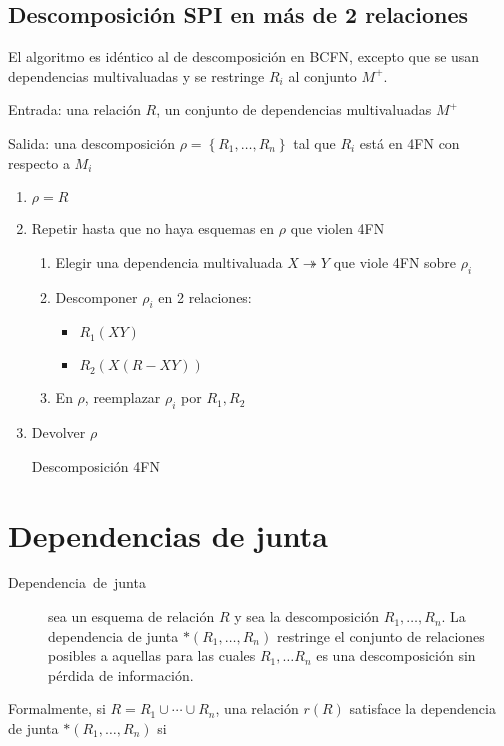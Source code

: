 \documentclass[a4paper, twoside]{article}
\begin{document}
\subsection{Descomposición SPI en más de 2 relaciones}

El algoritmo es idéntico al de descomposición en BCFN, excepto que
se usan dependencias multivaluadas y se restringe $R_{i}$ al conjunto
$M^{+}$.

\begin{algorithm}[H]
Entrada: una relación $R$, un conjunto de dependencias multivaluadas
$M^{+}$

Salida: una descomposición $\rho=\left\{ R_{1},\ldots,R_{n}\right\} $
tal que $R_{i}$ está en 4FN con respecto a $M_{i}$
\begin{enumerate}
\item $\rho=R$
\item Repetir hasta que no haya esquemas en $\rho$ que violen 4FN

\begin{enumerate}
\item Elegir una dependencia multivaluada $X\twoheadrightarrow Y$ que viole
4FN sobre $\rho_{i}$
\item Descomponer $\rho_{i}$ en 2 relaciones:

\begin{itemize}
\item $R_{1}\left(XY\right)$
\item $R_{2}\left(X(R-XY)\right)$
\end{itemize}
\item En $\rho$, reemplazar $\rho_{i}$ por $R_{1},R_{2}$
\end{enumerate}
\item Devolver $\rho$\protect\caption{Descomposición 4FN}
\end{enumerate}
\end{algorithm}



\section{Dependencias de junta}
\begin{description}
\item [{Dependencia~de~junta}] sea un esquema de relación $R$ y sea
la descomposición $R_{1},\ldots,R_{n}$. La dependencia de junta $*\left(R_{1},\ldots,R_{n}\right)$
restringe el conjunto de relaciones posibles a aquellas para las cuales
$R_{1},\ldots R_{n}$ es una descomposición sin pérdida de información.
\end{description}
Formalmente, si $R=R_{1}\cup\cdots\cup R_{n}$, una relación $r(R)$
satisface la dependencia de junta $*\left(R_{1},\ldots,R_{n}\right)$
si 
\end{document}
